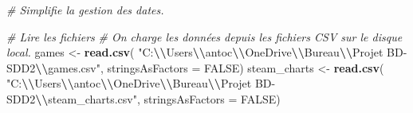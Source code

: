 \documentclass[mstat,12pt]{unswthesis}
\newenvironment{Shaded}{\begin{snugshade}}{\end{snugshade}}
\newcommand{\AttributeTok}[1]{\textcolor[rgb]{0.13,0.29,0.53}{#1}}
\newcommand{\CommentTok}[1]{\textcolor[rgb]{0.56,0.35,0.01}{\textit{#1}}}
\newcommand{\ConstantTok}[1]{\textcolor[rgb]{0.56,0.35,0.01}{#1}}
\newcommand{\FunctionTok}[1]{\textcolor[rgb]{0.13,0.29,0.53}{\textbf{#1}}}
\newcommand{\NormalTok}[1]{#1}
\newcommand{\OtherTok}[1]{\textcolor[rgb]{0.56,0.35,0.01}{#1}}
\newcommand{\SpecialCharTok}[1]{\textcolor[rgb]{0.81,0.36,0.00}{\textbf{#1}}}
\newcommand{\StringTok}[1]{\textcolor[rgb]{0.31,0.60,0.02}{#1}}
\begin{document}
\begin{Shaded}
\begin{Highlighting}[]
\CommentTok{\# Simplifie la gestion des dates.}

\CommentTok{\# Lire les fichiers}
\CommentTok{\# On charge les données depuis les fichiers CSV sur le disque local.}
\NormalTok{games }\OtherTok{\textless{}{-}} \FunctionTok{read.csv}\NormalTok{(}
  \StringTok{"C:}\SpecialCharTok{\textbackslash{}\textbackslash{}}\StringTok{Users}\SpecialCharTok{\textbackslash{}\textbackslash{}}\StringTok{antoc}\SpecialCharTok{\textbackslash{}\textbackslash{}}\StringTok{OneDrive}\SpecialCharTok{\textbackslash{}\textbackslash{}}\StringTok{Bureau}\SpecialCharTok{\textbackslash{}\textbackslash{}}\StringTok{Projet BD{-}SDD2}\SpecialCharTok{\textbackslash{}\textbackslash{}}\StringTok{games.csv"}\NormalTok{,}
  \AttributeTok{stringsAsFactors =} \ConstantTok{FALSE}\NormalTok{)}
\NormalTok{steam\_charts }\OtherTok{\textless{}{-}} \FunctionTok{read.csv}\NormalTok{(}
  \StringTok{"C:}\SpecialCharTok{\textbackslash{}\textbackslash{}}\StringTok{Users}\SpecialCharTok{\textbackslash{}\textbackslash{}}\StringTok{antoc}\SpecialCharTok{\textbackslash{}\textbackslash{}}\StringTok{OneDrive}\SpecialCharTok{\textbackslash{}\textbackslash{}}\StringTok{Bureau}\SpecialCharTok{\textbackslash{}\textbackslash{}}\StringTok{Projet BD{-}SDD2}\SpecialCharTok{\textbackslash{}\textbackslash{}}\StringTok{steam\_charts.csv"}\NormalTok{,}
  \AttributeTok{stringsAsFactors =} \ConstantTok{FALSE}\NormalTok{)}


\end{Highlighting}
\end{Shaded}
\end{document}
